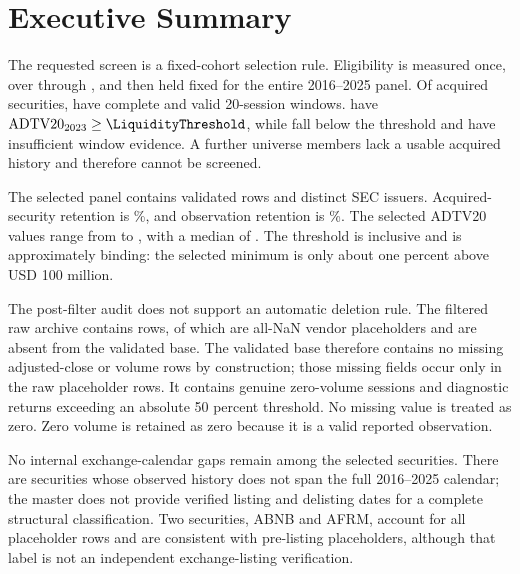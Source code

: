 \section{Executive Summary}

The requested screen is a fixed-cohort selection rule. Eligibility is measured
once, over \LiquidityWindowStart{} through \LiquidityWindowEnd{}, and then held
fixed for the entire 2016--2025 panel. Of \AcquiredSecurities{} acquired
securities, \CompleteWindowSecurities{} have complete and valid 20-session
windows. \SelectedSecurities{} have
\(\mathrm{ADTV20}_{2023}\geq\LiquidityThreshold\), while
\BelowThreshold{} fall below the threshold and \InsufficientWindow{} have
insufficient window evidence. A further \NotAcquired{} universe members lack a
usable acquired history and therefore cannot be screened.

The selected panel contains \SelectedObservations{} validated rows and
\SelectedIssuers{} distinct SEC issuers. Acquired-security retention is
\AcquiredRetentionPct\%, and observation retention is
\ObservationRetentionPct\%. The selected ADTV20 values range from
\SelectedADTVMinimum{} to \SelectedADTVMaximum{}, with a median of
\SelectedADTVMedian{}. The threshold is inclusive and is approximately binding:
the selected minimum is only about one percent above USD 100 million.

The post-filter audit does not support an automatic deletion rule. The
filtered raw archive contains \RawSelectedRows{} rows, of which
\PlaceholderRows{} are all-NaN vendor placeholders and are absent from the
validated base. The validated base therefore contains no missing
adjusted-close or volume rows by construction; those missing fields occur only
in the raw placeholder rows. It contains \ZeroVolumeRows{} genuine zero-volume
sessions and \ExtremeReturns{} diagnostic returns exceeding an absolute
50 percent threshold. No missing value is treated as zero. Zero volume is
retained as zero because it is a valid reported observation.

No internal exchange-calendar gaps remain among the selected securities.
There are \IncompleteHistorySecurities{} securities whose observed history does
not span the full 2016--2025 calendar; the master does not provide verified
listing and delisting dates for a complete structural classification. Two
securities, ABNB and AFRM, account for all \PlaceholderRows{} placeholder rows
and are consistent with pre-listing placeholders, although that label is not an
independent exchange-listing verification.

